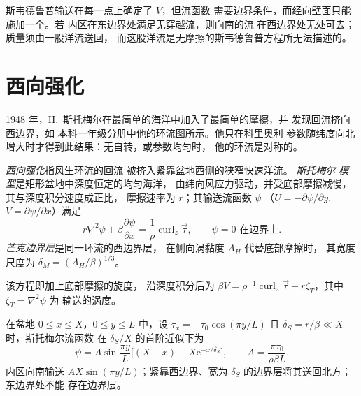 斯韦德鲁普输送在每一点上确定了 $V$，但流函数
需要边界条件，而经向壁面只能施加一个。若
内区在东边界处满足无穿越流，则向南的流
在西边界处无处可去；质量须由一股洋流送回，
而这股洋流是无摩擦的斯韦德鲁普方程所无法描述的。

\section{西向强化}\label{sec:b3:ocean-dynamics:western}

1948 年，H.~斯托梅尔在最简单的海洋中加入了最简单的摩擦，并
发现回流挤向西边界，如
本科一年级分册中他的环流图所示。他只在科里奥利
参数随纬度向北增大时才得到此结果：无自转，或参数均匀时，
他的环流是对称的。

\begin{definition}\label{def:b3:ocean-dynamics:western-intensification}
\emph{西向强化}指风生环流的回流
被挤入紧靠盆地西侧的狭窄快速洋流。
\emph{斯托梅尔
模型}是矩形盆地中深度恒定的均匀海洋，
由纬向风应力驱动，并受底部摩擦减慢，其与深度积分速度成正比，
摩擦速率为 $r$；其输送流函数 $\psi$
（$U = -\partial\psi/\partial y$, $V =
\partial\psi/\partial x$）满足
\[
r\nabla^2\psi + \beta\frac{\partial\psi}{\partial x} =
\frac{1}{\rho}\operatorname{curl}_z\vec\tau ,\qquad \psi = 0 \text{ 在边界上.}
\]
\emph{芒克边界层}是同一环流的西边界层，
在侧向涡黏度 $A_H$ 代替底部摩擦时，
其宽度尺度为 $\delta_M =
(A_H/\beta)^{1/3}$。
\end{definition}

该方程即加上底部摩擦的旋度，
沿深度积分后为 $\beta V = \rho^{-1}\operatorname{curl}_z
\vec\tau - r\zeta_T$，其中 $\zeta_T = \nabla^2\psi$ 为
输送的涡度。

\begin{theorem}[斯托梅尔环流的西边界层]\label{thm:b3:ocean-dynamics:stommel}
在盆地 $0 \le x \le X$，$0 \le y \le L$ 中，设 $\tau_x = -\tau_0
\cos(\pi y/L)$ 且 $\delta_S = r/\beta \ll X$ 时，斯托梅尔流函数
在 $\delta_S/X$ 的首阶近似下为
\[
\psi = A\sin\frac{\pi y}{L}\Big[(X - x) - X\mathrm e^{-x/\delta_S}\Big],
\qquad A = \frac{\pi\tau_0}{\rho\beta L} .
\]
内区向南输送 $AX\sin(\pi y/L)$；紧靠西边界、宽为
$\delta_S$ 的边界层将其送回北方；东边界处不能
存在边界层。
\end{theorem}

